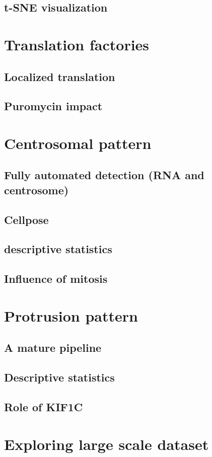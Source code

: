 \subsection{t-SNE visualization}


\section{Translation factories}


\subsection{Localized translation}

\subsection{Puromycin impact}


\section{Centrosomal pattern}


\subsection{Fully automated detection (\ac{RNA} and centrosome)}

\subsection{Cellpose}

\subsection{descriptive statistics}

\subsection{Influence of mitosis}


\section{Protrusion pattern}


\subsection{A mature pipeline}

\subsection{Descriptive statistics}

\subsection{Role of KIF1C}


\section{Exploring large scale dataset}
